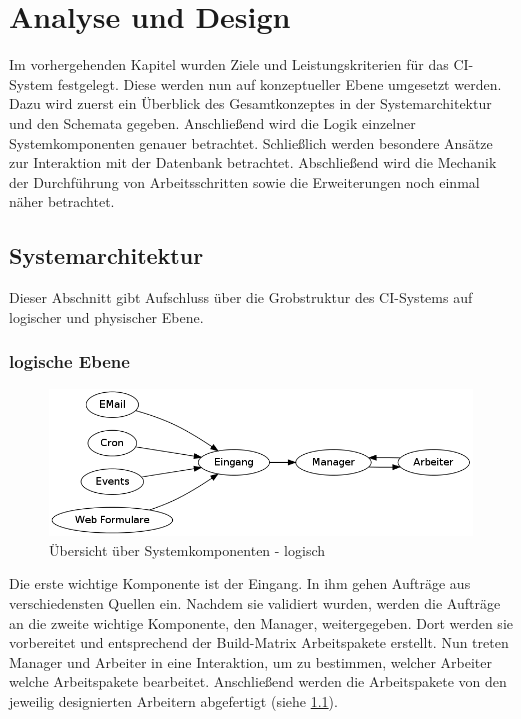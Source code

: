 \chapter{Analyse und Design}
\label{chap:design}

Im vorhergehenden Kapitel wurden Ziele und Leistungskriterien
für das \ac{CI}-System festgelegt.
Diese werden nun auf konzeptueller Ebene umgesetzt werden.
Dazu wird zuerst ein Überblick des Gesamtkonzeptes in der Systemarchitektur und den Schemata gegeben.
Anschließend wird die Logik einzelner Systemkomponenten genauer betrachtet.
Schließlich werden besondere Ansätze zur Interaktion mit der Datenbank betrachtet.
Abschließend wird die Mechanik der Durchführung von Arbeitsschritten sowie die Erweiterungen noch einmal näher betrachtet.



\section{Systemarchitektur}
\label{sec:design:sysarch}
Dieser Abschnitt gibt Aufschluss über die Grobstruktur des \ac{CI}-Systems auf logischer und physischer Ebene.

\subsection{logische Ebene}

\begin{figure}[ht]
  \centering
  \includegraphics[width=\textwidth]{imageinput/grob-layout-komponenten-logisch.png}
  \caption{\"Ubersicht über Systemkomponenten - logisch}
  \label{fig:grob-layout-komponenten-logisch}
\end{figure}


Die erste wichtige Komponente ist der Eingang.
In ihm gehen Aufträge aus verschiedensten Quellen ein.
Nachdem sie validiert wurden, werden die Aufträge an
die zweite wichtige Komponente, den Manager, weitergegeben.
Dort werden sie vorbereitet und entsprechend der Build-Matrix Arbeitspakete erstellt.
Nun treten Manager und Arbeiter in eine Interaktion,
um zu bestimmen, welcher Arbeiter welche Arbeitspakete bearbeitet.
Anschließend werden die Arbeitspakete von den jeweilig designierten Arbeitern abgefertigt (siehe \cref{fig:grob-layout-komponenten-logisch}).

